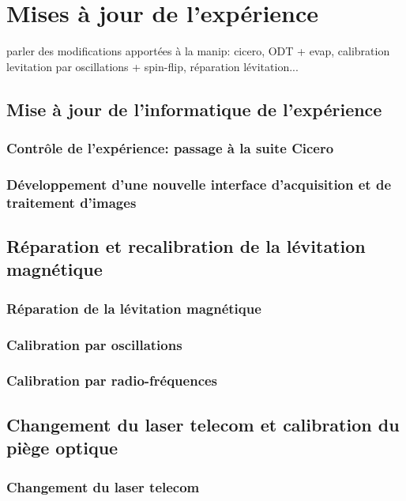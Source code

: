\chapter{Mises à jour de l'expérience}


parler des modifications apportées à la manip: cicero, ODT + evap, calibration levitation par oscillations + spin-flip, réparation lévitation...

\section{Mise à jour de l'informatique de l'expérience}
\subsection{Contrôle de l'expérience: passage à la suite Cicero}
\subsection{Développement d'une nouvelle interface d'acquisition et de traitement d'images}

\section{Réparation et recalibration de la lévitation magnétique}
\subsection{Réparation de la lévitation magnétique}
\subsection{Calibration par oscillations}
\subsection{Calibration par radio-fréquences}

\section{Changement du laser telecom et calibration du piège optique}
\subsection{Changement du laser telecom}
